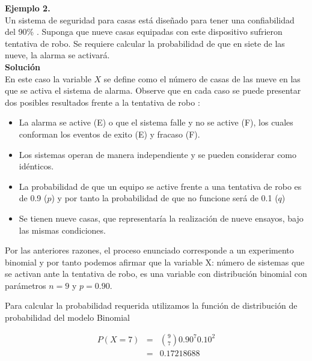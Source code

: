 \documentclass[base=hide,12pt]{elegantbook}
\begin{document}
\vspace{.5cm} 
\textcolor{col3}{\bf \large Ejemplo 2.} \\
Un sistema de seguridad para casas está diseñado para tener una confiabilidad del 90\% . Suponga que nueve casas equipadas con este dispositivo sufrieron tentativa de robo. Se requiere calcular la probabilidad de que en siete de las nueve, la alarma se activará. \\

\vspace{.5cm} 
\textcolor{col3}{\bf \large Solución}\\
En este caso la variable $X$ se define como el número de casas de las nueve en las que se activa el sistema de alarma. Observe que en cada caso se puede presentar dos posibles resultados frente a la tentativa de robo : 

\begin{itemize}
	\item La alarma se active (E) o que el sistema falle y no se active (F), los cuales conforman los eventos de exito (E) y fracaso (F).
	\item Los sistemas operan de manera independiente y se pueden considerar como idénticos.
	\item La probabilidad de que un equipo se active frente a una tentativa de robo es de 0.9 ($p$) y por tanto la probabilidad de que no funcione será de 0.1 ($q$)
	\item Se tienen nueve casas, que representaría la realización de nueve ensayos, bajo las mismas condiciones.
\end{itemize}

Por las anteriores razones, el proceso enunciado corresponde a un experimento binomial y por tanto podemos afirmar que la variable X: número de sistemas que se activan ante la tentativa de robo, es una variable con distribución binomial con parámetros $n=9$ y $p=0.90$.

Para calcular la probabilidad requerida utilizamos la función de distribución de probabilidad del modelo Binomial

\begin{equation*}
	\begin{array}{lcl}
		P(X=7)&=& \displaystyle\binom{9}{7} 0.90^{7} 0.10^{2} \\
		&=& 0.17218688 
	\end{array}
\end{equation*}
\end{document}
